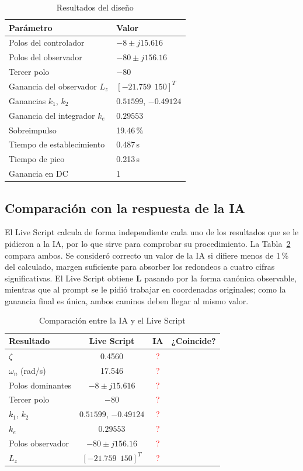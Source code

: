 \documentclass[conference]{IEEEtran}
\begin{document}
\begin{table}[!t]
\centering
\caption{Resultados del diseño}
\label{tab:resultados}
\begin{tabular}{@{}ll@{}}
\toprule
Parámetro & Valor \\
\midrule
Polos del controlador & $-8 \pm j15.616$ \\
Polos del observador & $-80 \pm j156.16$ \\
Tercer polo & $-80$ \\
Ganancia del observador $L_z$ & $[-21.759\ \ 150]^T$ \\
Ganancias $k_1$, $k_2$ & $0.51599$, $-0.49124$ \\
Ganancia del integrador $k_e$ & $0.29553$ \\
Sobreimpulso & 19.46\,\% \\
Tiempo de establecimiento & 0.487\,s \\
Tiempo de pico & 0.213\,s \\
Ganancia en DC & 1 \\
\bottomrule
\end{tabular}
\end{table}

\subsection{Comparación con la respuesta de la IA}

El Live Script calcula de forma independiente cada uno de los resultados que se le pidieron a la IA, por lo que sirve para comprobar su procedimiento. La Tabla~\ref{tab:comparacion} compara ambos. Se consideró correcto un valor de la IA si difiere menos de 1\,\% del calculado, margen suficiente para absorber los redondeos a cuatro cifras significativas. El Live Script obtiene $\mathbf{L}$ pasando por la forma canónica observable, mientras que al prompt se le pidió trabajar en coordenadas originales; como la ganancia final es única, ambos caminos deben llegar al mismo valor.

\begin{table}[!t]
\centering
\caption{Comparación entre la IA y el Live Script}
\label{tab:comparacion}
\small\setlength{\tabcolsep}{4pt}
\begin{tabular}{lccc}
\toprule
Resultado & Live Script & IA & ¿Coincide? \\
\midrule
$\zeta$ & 0.4560 & \textcolor{red}{?} & \\
$\omega_n$ (rad/s) & 17.546 & \textcolor{red}{?} & \\
Polos dominantes & $-8 \pm j15.616$ & \textcolor{red}{?} & \\
Tercer polo & $-80$ & \textcolor{red}{?} & \\
$k_1$, $k_2$ & $0.51599$, $-0.49124$ & \textcolor{red}{?} & \\
$k_e$ & $0.29553$ & \textcolor{red}{?} & \\
Polos observador & $-80 \pm j156.16$ & \textcolor{red}{?} & \\
$L_z$ & $[-21.759\ \ 150]^T$ & \textcolor{red}{?} & \\
\bottomrule
\end{tabular}
\end{table}
\end{document}
